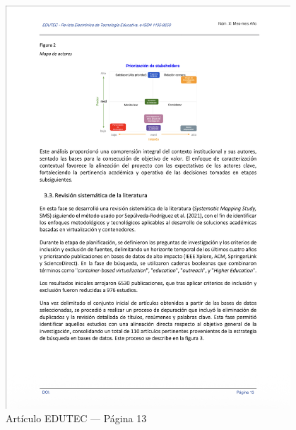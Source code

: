 \begin{figure}[H]
    \centering
    \begin{tcolorbox}[
        colback=white,
        colframe=gray!50,
        boxrule=1pt,
        arc=2pt,
        boxsep=5pt,
        left=3pt,
        right=3pt,
        top=3pt,
        bottom=3pt,
        drop shadow
    ]
        \includegraphics[width=0.95\textwidth,keepaspectratio]{apendices/EDUTEC/13.png}
    \end{tcolorbox}
    \caption{Artículo EDUTEC --- Página 13}\label{fig:edutec-pagina-13}
\end{figure}
\FloatBarrier

